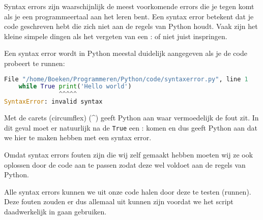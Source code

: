 Syntax errors zijn waarschijnlijk de meest voorkomende errors die je tegen komt als je een programmeertaal aan het leren bent. Een syntax error betekent dat je code geschreven hebt die zich niet aan de regels van Python houdt. Vaak zijn het kleine simpele dingen als het vergeten van een : of niet juist inspringen.

Een syntax error wordt in Python meestal duidelijk aangegeven als je de code probeert te runnen:
\begin{lstlisting}[language=python]
  File "/home/Boeken/Programmeren/Python/code/syntaxerror.py", line 1
    while True print('Hello world')
               ^^^^^
SyntaxError: invalid syntax
\end{lstlisting}
Met de carets (circumflex) (\textasciicircum) geeft Python aan waar vermoedelijk de fout zit. In dit geval moet er natuurlijk na de \texttt{True} een : komen en dus geeft Python aan dat we hier te maken hebben met een syntax error.

Omdat syntax errors fouten zijn die wij zelf gemaakt hebben moeten wij ze ook oplossen door de code aan te passen zodat deze wel voldoet aan de regels van Python.

Alle syntax errors kunnen we uit onze code halen door deze te testen (runnen). Deze fouten zouden er dus allemaal uit kunnen zijn voordat we het script daadwerkelijk in  gaan gebruiken.

